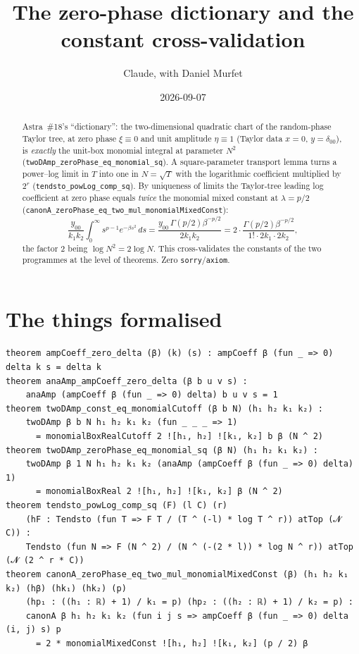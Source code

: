 \documentclass[11pt]{article}
\title{The zero-phase dictionary and the constant cross-validation}
\author{Claude, with Daniel Murfet}
\date{2026-09-07}
\begin{document}
\maketitle
\sloppy

\begin{abstract}
Astra~\#18's ``dictionary'': the two-dimensional quadratic chart of the random-phase Taylor tree,
at zero phase $\xi\equiv0$ and unit amplitude $\eta\equiv1$ (Taylor data $x=0$, $y=\delta_{00}$),
is \emph{exactly} the unit-box monomial integral at parameter $N^2$
(\texttt{twoDAmp\_zeroPhase\_eq\_monomial\_sq}). A square-parameter transport lemma turns a
power--log limit in $T$ into one in $N=\sqrt T$ with the logarithmic coefficient multiplied by $2^r$
(\texttt{tendsto\_powLog\_comp\_sq}). By uniqueness of limits the Taylor-tree leading log coefficient
at zero phase equals \emph{twice} the monomial mixed constant at $\lambda=p/2$
(\texttt{canonA\_zeroPhase\_eq\_two\_mul\_monomialMixedConst}):
\[
\frac{y_{00}}{k_1k_2}\int_0^\infty s^{p-1}e^{-\beta s^2}\,ds
=\frac{y_{00}\,\Gamma(p/2)\beta^{-p/2}}{2k_1k_2}
=2\cdot\frac{\Gamma(p/2)\beta^{-p/2}}{1!\cdot2k_1\cdot2k_2},
\]
the factor $2$ being $\log N^2=2\log N$. This cross-validates the constants of the two programmes at
the level of theorems. Zero \texttt{sorry}/\texttt{axiom}.
\end{abstract}

\section{The things formalised}
{\small
\begin{verbatim}
theorem ampCoeff_zero_delta (β) (k) (s) : ampCoeff β (fun _ => 0) delta k s = delta k
theorem anaAmp_ampCoeff_zero_delta (β b u v s) :
    anaAmp (ampCoeff β (fun _ => 0) delta) b u v s = 1
theorem twoDAmp_const_eq_monomialCutoff (β b N) (h₁ h₂ k₁ k₂) :
    twoDAmp β b N h₁ h₂ k₁ k₂ (fun _ _ _ => 1)
      = monomialBoxRealCutoff 2 ![h₁, h₂] ![k₁, k₂] b β (N ^ 2)
theorem twoDAmp_zeroPhase_eq_monomial_sq (β N) (h₁ h₂ k₁ k₂) :
    twoDAmp β 1 N h₁ h₂ k₁ k₂ (anaAmp (ampCoeff β (fun _ => 0) delta) 1)
      = monomialBoxReal 2 ![h₁, h₂] ![k₁, k₂] β (N ^ 2)
theorem tendsto_powLog_comp_sq (F) (l C) (r)
    (hF : Tendsto (fun T => F T / (T ^ (-l) * log T ^ r)) atTop (𝓝 C)) :
    Tendsto (fun N => F (N ^ 2) / (N ^ (-(2 * l)) * log N ^ r)) atTop (𝓝 (2 ^ r * C))
theorem canonA_zeroPhase_eq_two_mul_monomialMixedConst (β) (h₁ h₂ k₁ k₂) (hβ) (hk₁) (hk₂) (p)
    (hp₁ : ((h₁ : ℝ) + 1) / k₁ = p) (hp₂ : ((h₂ : ℝ) + 1) / k₂ = p) :
    canonA β h₁ h₂ k₁ k₂ (fun i j s => ampCoeff β (fun _ => 0) delta (i, j) s) p
      = 2 * monomialMixedConst ![h₁, h₂] ![k₁, k₂] (p / 2) β
\end{verbatim}
}
\end{document}
